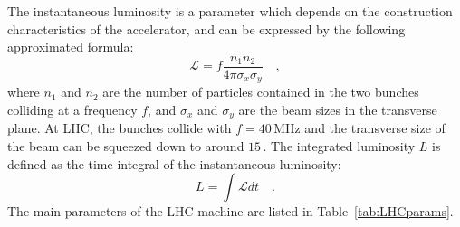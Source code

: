 The instantaneous luminosity is a parameter which depends on the construction characteristics of the accelerator, and can be expressed by the following approximated formula:
\begin{equation}
\mathcal{L} = f\frac{n_1 n_2}{4\pi\sigma_x\sigma_y} \quad ,
\end{equation}
where $n_1$ and $n_2$ are the number of particles contained in the two bunches colliding at a frequency $f$, and $\sigma_x$ and $\sigma_y$ are the beam sizes in the transverse plane. At LHC, the bunches collide with $f=40$\,MHz and the transverse size of the beam can be squeezed down to around $15$\,\micron.
The integrated luminosity $L$ is defined as the time integral of the instantaneous luminosity:
\begin{equation}
L = \int \mathcal{L} dt \quad .
\end{equation}
The main parameters of the LHC machine are listed in Table~\ref{tab:LHCparams}.

